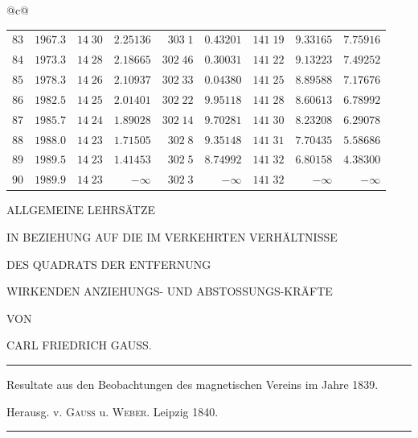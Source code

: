\begin{center}
{\begin{tabular}{@{}c@{}}
\begin{tabular}{r|r|r|r|r|r|r|r|r}
$83$&$1967.3$&$14\;30$&$2.25136$&$303\;1$&$0.43201$&$141\;19$&$9.33165$&$7.75916$\\
$84$&$1973.3$&$14\;28$&$2.18665$&$302\;46$&$0.30031$&$141\;22$&$9.13223$&$7.49252$\\[2pt]
$85$&$1978.3$&$14\;26$&$2.10937$&$302\;33$&$0.04380$&$141\;25$&$8.89588$&$7.17676$\\
$86$&$1982.5$&$14\;25$&$2.01401$&$302\;22$&$9.95118$&$141\;28$&$8.60613$&$6.78992$\\
$87$&$1985.7$&$14\;24$&$1.89028$&$302\;14$&$9.70281$&$141\;30$&$8.23208$&$6.29078$\\
$88$&$1988.0$&$14\;23$&$1.71505$&$302\;8$&$9.35148$&$141\;31$&$7.70435$&$5.58686$\\
$89$&$1989.5$&$14\;23$&$1.41453$&$302\;5$&$8.74992$&$141\;32$&$6.80158$&$4.38300$\\[2pt]
$90$&$1989.9$&$14\;23$&$-\infty$&$302\;3$&$-\infty$&$141\;32$&$-\infty$&$-\infty$\\
\end{tabular}
\end{tabular}%
}
\end{center}
\endgroup
\clearpage
\thispagestyle{empty}\null
\clearpage
\thispagestyle{empty}
\begin{center}
\vspace*{0.6in}
{\Large ALLGEMEINE LEHRSÄTZE\par}
\bigskip
IN BEZIEHUNG AUF DIE IM VERKEHRTEN VERHÄLTNISSE\par
\bigskip
{\Large DES QUADRATS DER ENTFERNUNG\par}
\bigskip
WIRKENDEN ANZIEHUNGS- UND ABSTOSSUNGS-KRÄFTE\par
\vspace{0.5in}
VON\par
\bigskip
{\large CARL FRIEDRICH GAUSS.\par}
\vfill
\rule{0.85\textwidth}{0.3pt}\par
Resultate aus den Beobachtungen des magnetischen Vereins im Jahre 1839.\par
Herausg. v. \textsc{Gauss} u. \textsc{Weber}. Leipzig 1840.\par
\rule{0.85\textwidth}{0.3pt}
\end{center}
